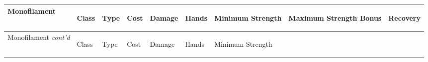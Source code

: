 \documentclass[twoside]{book}
\begin{document}
\begin{longtable}{p{1.25in}llllp{2em}p{3em}p{3em}l} 
  Monofilament
  &
  \begin{turn}{70}{Class}\end{turn}
          
  &
  \begin{turn}{70}{Type}\end{turn}
          
  &
  \begin{turn}{70}{Cost}\end{turn}
          
  &
  \begin{turn}{70}{Damage}\end{turn}
          
  &
  \begin{turn}{70}{Hands}\end{turn}
          
  &
  \begin{turn}{70}{Minimum Strength}\end{turn}
          
  &
  \begin{turn}{70}{Maximum Strength Bonus}\end{turn}
          
  &
  \begin{turn}{70}{Recovery}\end{turn}
          
  \\
  \hline
  \hline
  \endfirsthead
  Monofilament \textit{cont'd}
        
  &
  \begin{turn}{70}{Class}\end{turn}
          
  &
  \begin{turn}{70}{Type}\end{turn}
          
  &
  \begin{turn}{70}{Cost}\end{turn}
          
  &
  \begin{turn}{70}{Damage}\end{turn}
          
  &
  \begin{turn}{70}{Hands}\end{turn}
          
  &
  \begin{turn}{70}{Minimum Strength}\end{turn}
          

\end{longtable}
\end{document}
